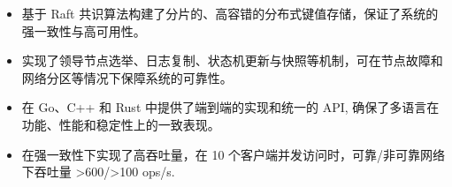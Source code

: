 


\begin{itemize}[nosep]
  \item 基于 Raft 共识算法构建了分片的、高容错的分布式键值存储，保证了系统的强一致性与高可用性。
  \item 实现了领导节点选举、日志复制、状态机更新与快照等机制，可在节点故障和网络分区等情况下保障系统的可靠性。
  \item 在 Go、C++ 和 Rust 中提供了端到端的实现和统一的 API, 确保了多语言在功能、性能和稳定性上的一致表现。
  \item 在强一致性下实现了高吞吐量，在 10 个客户端并发访问时，可靠/非可靠网络下吞吐量 >600/>100 ops/s.
\end{itemize}
